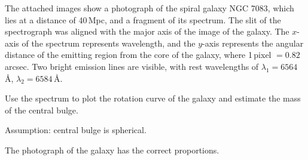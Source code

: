 The attached images show a photograph of the spiral galaxy NGC 7083, which
lies at a distance of 40\,Mpc, and a fragment of its spectrum. The slit of the
spectrograph was aligned with the major axis of the image of the galaxy. The
$x$-axis of the spectrum represents wavelength, and the $y$-axis represents
the angular distance of the emitting region from the core of the galaxy, where
1\,pixel $= 0.82$\,arcsec. Two bright emission lines are visible, with rest
wavelengths of $\lambda_1 = 6564$\,\AA, $\lambda_2 = 6584$\,\AA.

Use the spectrum to plot the rotation curve of the galaxy and estimate the
mass of the central bulge.

Assumption: central bulge is spherical.

The photograph of the galaxy has the correct proportions.

